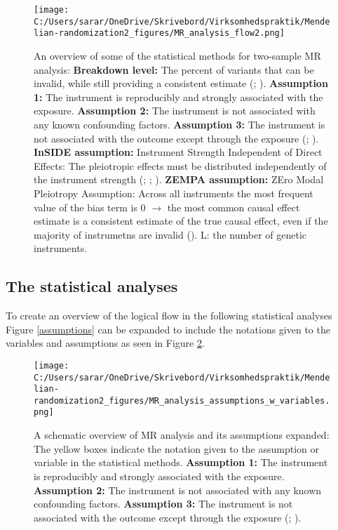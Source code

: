 \documentclass[
]{article}
\begin{document}
\begin{figure}
\centering
\texttt{[image: C:/Users/sarar/OneDrive/Skrivebord/Virksomhedspraktik/Mendelian-randomization2\_figures/MR\_analysis\_flow2.png]}
\caption{An overview of some of the statistical methods for two-sample
MR analysis: \textbf{Breakdown level:} The percent of variants that can
be invalid, while still providing a consistent estimate
(;
).
\textbf{Assumption 1:} The instrument is reproducibly and strongly
associated with the exposure. \textbf{Assumption 2:} The instrument is
not associated with any known confounding factors. \textbf{Assumption
3:} The instrument is not associated with the outcome except through the
exposure (;
). \textbf{InSIDE
assumption:} Instrument Strength Independent of Direct Effects: The
pleiotropic effects must be distributed independently of the instrument
strength (;
;
).
\textbf{ZEMPA assumption:} ZEro Modal Pleiotropy Assumption: Across all
instruments the most frequent value of the bias term is 0 \(\to\) the
most common causal effect estimate is a consistent estimate of the true
causal effect, even if the majority of instrumetns are invalid
(). L: the
number of genetic instruments.\label{flow}}
\end{figure}

\subsection{The statistical analyses}\label{the-statistical-analyses}

To create an overview of the logical flow in the following statistical
analyses Figure \ref{assumptions} can be expanded to include the
notations given to the variables and assumptions as seen in Figure
\ref{assumptions_expand}.

\begin{figure}
\centering
\texttt{[image: C:/Users/sarar/OneDrive/Skrivebord/Virksomhedspraktik/Mendelian-randomization2\_figures/MR\_analysis\_assumptions\_w\_variables.png]}
\caption{A schematic overview of MR analysis and its assumptions
expanded: The yellow boxes indicate the notation given to the assumption
or variable in the statistical methods. \textbf{Assumption 1:} The
instrument is reproducibly and strongly associated with the exposure.
\textbf{Assumption 2:} The instrument is not associated with any known
confounding factors. \textbf{Assumption 3:} The instrument is not
associated with the outcome except through the exposure
(;
).
\label{assumptions_expand}}
\end{figure}
\end{document}
